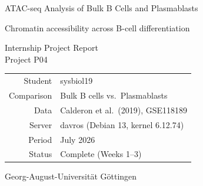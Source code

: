 \begin{titlepage}
\centering
\vspace*{4cm}

{\LARGE ATAC-seq Analysis of Bulk B Cells and Plasmablasts\par}

\vspace{1cm}
{\large Chromatin accessibility across B-cell differentiation\par}

\vspace{3cm}
Internship Project Report\\
Project P04

\vspace{3cm}
\begin{tabular}{@{}rl@{}}
Student    & sysbiol19 \\
Comparison & Bulk B cells vs.\ Plasmablasts \\
Data       & Calderon et al.\ (2019), GSE118189 \\
Server     & davros (Debian 13, kernel 6.12.74) \\
Period     & July 2026 \\
Status     & Complete (Weeks 1--3) \\
\end{tabular}

\vfill
Georg-August-Universität Göttingen
\vspace{1cm}
\end{titlepage}

\tableofcontents
\clearpage
